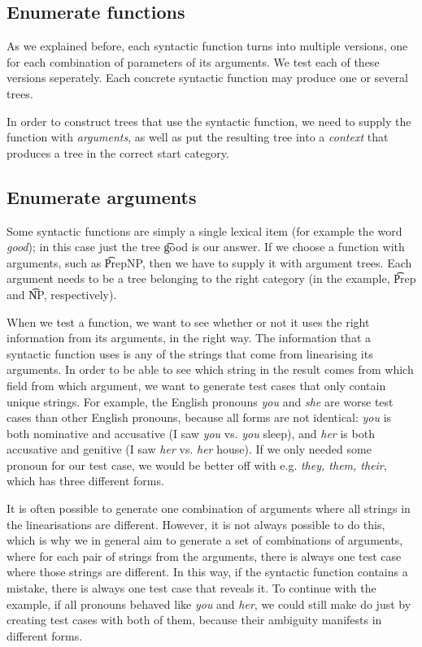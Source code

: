 \subsection{Enumerate functions} As we explained before, each syntactic
function turns into multiple versions, one for each combination of
parameters of its arguments. We test each of these versions
seperately. Each concrete syntactic function may produce one or several trees.

In order to construct trees that use the syntactic function, we need
to supply the function with \emph{arguments}, as well as put the resulting tree
into a \emph{context} that produces a tree in the correct start
category.

\subsection{Enumerate arguments} 
\label{enumerate-arguments}
Some syntactic functions are simply a single lexical item (for example
the word \emph{good}); in this case just the tree \t{good} is our
answer.  If we choose a function with arguments, such as \t{PrepNP},
then we have to supply it with argument trees. Each argument needs to
be a tree belonging to the right category (in the example, \t{Prep}
and \t{NP}, respectively).

When we test a function, we want to see whether or not it uses the
right information from its arguments, in the right way. The
information that a syntactic function uses is any of the strings that
come from linearising its arguments. In order to be able to see which
string in the result comes from which field from which argument, we
want to generate test cases that only contain unique strings.
For example, the English pronouns {\em you} and {\em she} are worse
test cases than other English pronouns, because all forms are not
identical: {\em you} is both nominative and accusative (I saw {\em
  you} vs. {\em you} sleep), and {\em her} is both accusative and
genitive (I saw {\em her} vs. {\em her} house). 
If we only needed some pronoun for our test case, we would be better
off with e.g. {\em they, them, their}, which has three different forms. 

It is often possible to generate one combination of arguments where
all strings in the linearisations are different. However, it is not
always possible to do this, which is why we in general aim to generate
a set of combinations of arguments, where for each pair of strings
from the arguments, there is always one test case where those strings
are different. In this way, if the syntactic function contains a
mistake, there is always one test case that reveals it.
To continue with the example, if all pronouns behaved like {\em you}
and {\em her}, we could still make do just by creating test cases with
both of them, because their ambiguity manifests in different forms.


